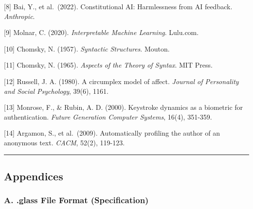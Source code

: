 \documentclass[
]{article}
\begin{document}
{[}8{]} Bai, Y., et al.~(2022). Constitutional AI: Harmlessness from AI
feedback. \emph{Anthropic}.

{[}9{]} Molnar, C. (2020). \emph{Interpretable Machine Learning}.
Lulu.com.

{[}10{]} Chomsky, N. (1957). \emph{Syntactic Structures}. Mouton.

{[}11{]} Chomsky, N. (1965). \emph{Aspects of the Theory of Syntax}. MIT
Press.

{[}12{]} Russell, J. A. (1980). A circumplex model of affect.
\emph{Journal of Personality and Social Psychology}, 39(6), 1161.

{[}13{]} Monrose, F., \& Rubin, A. D. (2000). Keystroke dynamics as a
biometric for authentication. \emph{Future Generation Computer Systems},
16(4), 351-359.

{[}14{]} Argamon, S., et al.~(2009). Automatically profiling the author
of an anonymous text. \emph{CACM}, 52(2), 119-123.

\begin{center}\rule{0.5\linewidth}{0.5pt}\end{center}

\subsection{Appendices}\label{appendices}

\subsubsection{A. .glass File Format
(Specification)}\label{a.-.glass-file-format-specification}
\end{document}
